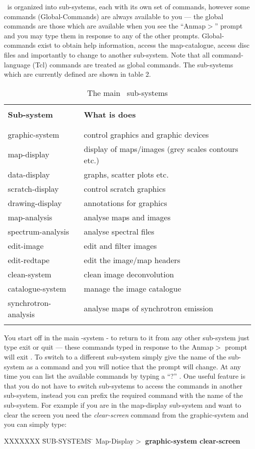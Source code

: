 \Anmap\ is organized into
sub-systems, each with its own set of commands, however some
commands (Global-Commands) are always available to you --- the
global commands are those which are available when you see the
``Anmap$>$'' prompt and you may type them in response to any of the
other prompts. Global-commands exist to obtain help
information, access the map-catalogue, access disc files and
importantly to change to another sub-system.  Note that all
command-language (Tcl) commands are treated as global commands.
The sub-systems which are currently defined are shown in table 2.
\begin{table}
\begin{tabular}{|l||l|}
\hline
& \\
{\bf Sub-system} & {\bf What is does} \\
& \\ \hline
& \\
graphic-system & control graphics and graphic devices \\
map-display & display of maps/images (grey scales contours etc.) \\
data-display & graphs, scatter plots etc. \\
scratch-display & control scratch graphics \\
drawing-display & annotations for graphics \\
map-analysis & analyse maps and images \\
spectrum-analysis & analyse spectral files \\
edit-image & edit and filter images \\
edit-redtape & edit the image/map headers \\
clean-system & clean image deconvolution \\
catalogue-system & manage the image catalogue \\
synchrotron-analysis & analyse maps of synchrotron emission \\
& \\ \hline
\end{tabular}
\caption{The main \Anmap\ sub-systems}
\end{table}

 
You start off in the main \Anmap-system - to return to it from any
other sub-system just type exit or quit --- these commands
typed in response to the Anmap$>$ prompt will exit \Anmap. 
To switch to a different
sub-system simply give the name of the sub-system as a command
and you will notice that the prompt will change.
At any time you can list the available commands by typing a
``?'' .  One useful feature is that you do not have to switch sub-systems
to access the commands in another sub-system, instead you can prefix
the required command with the name of the sub-system.  For example
if you are in the map-display sub-system and want to clear the screen
you need the {\em clear-screen} command from the graphic-system and
you can simply type:
\begin{tabbing}
XXXXXXX \= SUB-SYSTEMS \= \kill
\> Map-Display$>$  {\bf graphic-system clear-screen}
\end{tabbing}
 
